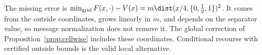 The missing error is $\min_{\rm grid}F(x,\cdot)-V(x)=m\dist(x/4,\{0,\tfrac12,
1\})^2$. It comes from the outside coordinates, grows linearly in $m$, and
depends on the separator value, so message normalization does not remove it.
The global correction of Proposition~\ref{prop:cellwise} includes these coordinates.
Conditional recourse with certified outside bounds is the valid local
alternative.

